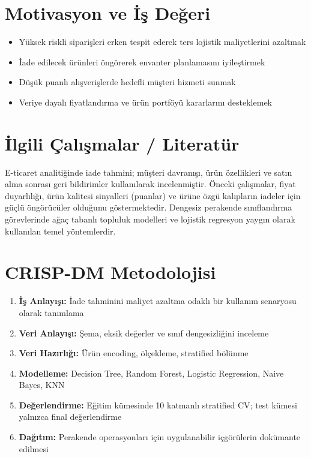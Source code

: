 \documentclass[12pt,a4paper]{report}
\begin{document}
\chapter{Motivasyon ve İş Değeri}
\begin{itemize}
    \item Yüksek riskli siparişleri erken tespit ederek ters lojistik maliyetlerini azaltmak
    \item İade edilecek ürünleri öngörerek envanter planlamasını iyileştirmek
    \item Düşük puanlı alışverişlerde hedefli müşteri hizmeti sunmak
    \item Veriye dayalı fiyatlandırma ve ürün portföyü kararlarını desteklemek
\end{itemize}

\chapter{İlgili Çalışmalar / Literatür}
E-ticaret analitiğinde iade tahmini; müşteri davranışı, ürün özellikleri ve satın alma sonrası geri bildirimler kullanılarak incelenmiştir.
Önceki çalışmalar, fiyat duyarlılığı, ürün kalitesi sinyalleri (puanlar) ve ürüne özgü kalıpların iadeler için güçlü öngörücüler olduğunu göstermektedir.
Dengesiz perakende sınıflandırma görevlerinde ağaç tabanlı topluluk modelleri ve lojistik regresyon yaygın olarak kullanılan temel yöntemlerdir.

\chapter{CRISP-DM Metodolojisi}
\begin{enumerate}
    \item \textbf{İş Anlayışı:} İade tahminini maliyet azaltma odaklı bir kullanım senaryosu olarak tanımlama
    \item \textbf{Veri Anlayışı:} Şema, eksik değerler ve sınıf dengesizliğini inceleme
    \item \textbf{Veri Hazırlığı:} Ürün encoding, ölçekleme, stratified bölünme
    \item \textbf{Modelleme:} Decision Tree, Random Forest, Logistic Regression, Naive Bayes, KNN
    \item \textbf{Değerlendirme:} Eğitim kümesinde 10 katmanlı stratified CV; test kümesi yalnızca final değerlendirme
    \item \textbf{Dağıtım:} Perakende operasyonları için uygulanabilir içgörülerin dokümante edilmesi
\end{enumerate}
\end{document}
